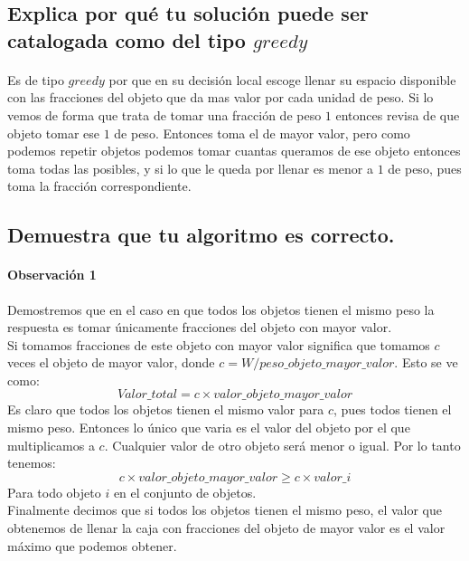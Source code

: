 \documentclass[12pt]{article}
\begin{document}
 \subsection{Explica por qué tu solución puede ser catalogada como del tipo $greedy$}
 \paragraph{} Es de tipo $greedy$ por que en su decisión local escoge llenar su espacio disponible con las fracciones del objeto que da mas valor por cada unidad de peso. Si lo vemos de forma que trata de tomar una fracción de peso $1$ entonces revisa de que objeto tomar ese $1$ de peso. Entonces toma el de mayor valor, pero como podemos repetir objetos podemos tomar cuantas queramos de ese objeto entonces toma todas las posibles, y si lo que le queda por llenar es menor a $1$ de peso, pues toma la fracción correspondiente. 
 \subsection{Demuestra que tu algoritmo es correcto.}
 \paragraph{Observación 1} Demostremos que en el caso en que todos los objetos tienen el mismo peso la respuesta es tomar únicamente fracciones del objeto con mayor valor.\\
 Si tomamos fracciones de este objeto con mayor valor significa que tomamos $c$ veces el objeto de mayor valor, donde $c= W/peso\_objeto\_mayor\_valor$. Esto se ve como:\\
  \begin{equation}
Valor\_total = c \times valor\_objeto\_mayor\_valor
  \end{equation}
 Es claro que todos los objetos tienen el mismo valor para $c$, pues todos tienen el mismo peso. Entonces lo único que varia es el valor del objeto por el que multiplicamos a $c$. Cualquier valor de otro objeto será menor o igual. Por lo tanto tenemos:
   \begin{equation}
 c \times valor\_objeto\_mayor\_valor \geq c \times valor\_i
 \end{equation}
 Para todo objeto $i$ en el conjunto de objetos.\\
 Finalmente decimos que si todos los objetos tienen el mismo peso, el valor que obtenemos de llenar la caja con fracciones del objeto de mayor valor es el valor máximo que podemos obtener.
\end{document}
